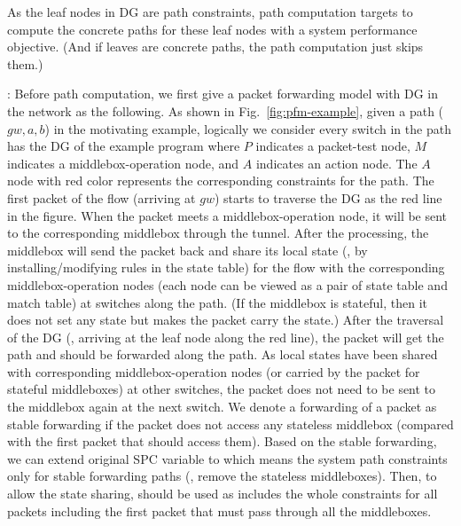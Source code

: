 As the leaf nodes in DG are path constraints, path computation targets to compute the concrete paths for these leaf nodes with a system performance objective. (And if leaves are concrete paths, the path computation just skips them.)

: Before path computation, we first give a packet forwarding model with DG in the network as the following. As shown in Fig.~\ref{fig:pfm-example}, given a path ($gw, a, b$) in the motivating example, logically we consider every switch in the path has the DG of the example program where $P$ indicates a packet-test node, $M$ indicates a middlebox-operation node, and $A$ indicates an action node. The $A$ node with red color represents the corresponding constraints for the path. The first packet of the flow (arriving at $gw$) starts to traverse the DG as the red line in the figure. When the packet meets a middlebox-operation node, it will be sent to the corresponding middlebox through the tunnel. After the processing, the middlebox will send the packet back and share its local state (\ie, by installing/modifying rules in the state table) for the flow with the corresponding middlebox-operation nodes (each node can be viewed as a pair of state table and match table) at switches along the path. (If the middlebox is stateful, then it does not set any state but makes the packet carry the state.) After the traversal of the DG (\ie, arriving at the leaf node along the red line), the packet will get the path and should be forwarded along the path. As local states have been shared with corresponding middlebox-operation nodes (or carried by the packet for stateful middleboxes) at other switches, the packet does not need to be sent to the middlebox again at the next switch. We denote a forwarding of a packet as stable forwarding if the packet does not access any stateless middlebox (compared with the first packet that should access them). Based on the stable forwarding, we can extend original SPC variable to  which means the system path constraints only for stable forwarding paths (\ie, remove the stateless middleboxes). Then, to allow the state sharing,  should be used as  includes the whole constraints for all packets including the first packet that must pass through all the middleboxes.

